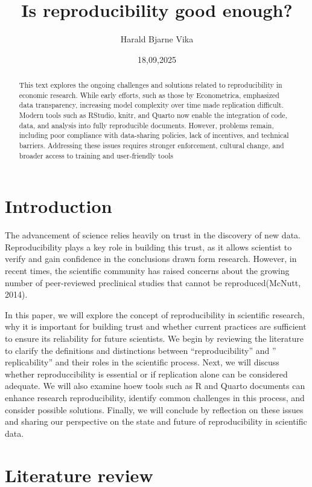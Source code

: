 \documentclass[
  a4paper,
]{article}
\title{Is reproducibility good enough?}
\author{Harald Bjarne Vika}
\date{18,09,2025}
\begin{document}
\maketitle
\begin{abstract}
This text explores the ongoing challenges and solutions related to
reproducibility in economic research. While early efforts, such as those
by Econometrica, emphasized data transparency, increasing model
complexity over time made replication difficult. Modern tools such as
RStudio, knitr, and Quarto now enable the integration of code, data, and
analysis into fully reproducible documents. However, problems remain,
including poor compliance with data-sharing policies, lack of
incentives, and technical barriers. Addressing these issues requires
stronger enforcement, cultural change, and broader access to training
and user-friendly tools
\end{abstract}


\section{Introduction}\label{introduction}

The advancement of science relies heavily on trust in the discovery of
new data. Reproducibility plays a key role in building this trust, as it
allows scientist to verify and gain confidence in the conclusions drawn
form research. However, in recent times, the scientific community has
raised concerns about the growing number of peer-reviewed preclinical
studies that cannot be reproduced(McNutt, 2014).

In this paper, we will explore the concept of reproducibility in
scientific research, why it is important for building trust and whether
current practices are sufficient to ensure its reliability for future
scientists. We begin by reviewing the literature to clarify the
definitions and distinctions between ``reproducibility'' and ''
replicability'' and their roles in the scientific process. Next, we will
discuss whether reproduccibility is essential or if replication alone
can be considered adequate. We will also examine hoew tools such as R
and Quarto documents can enhance research reproducibility, identify
common challenges in this process, and consider possible solutions.
Finally, we will conclude by reflection on these issues and sharing our
perspective on the state and future of reproducibility in scientific
data.

\section{Literature review}\label{literature-review}
\end{document}
